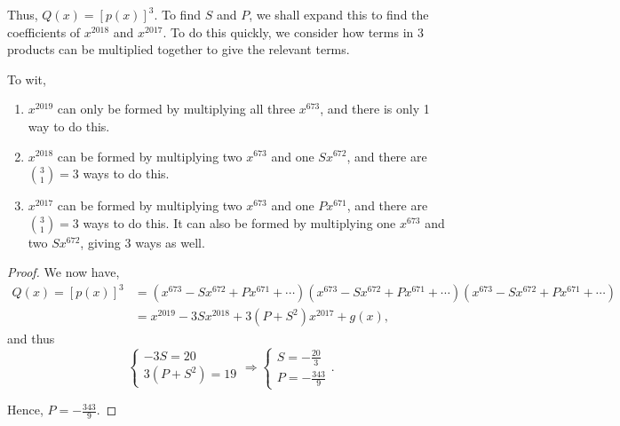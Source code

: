 \documentclass[../jarvis.tex]{subfiles}
\begin{document}
Thus, $Q(x)=[p(x)]^3$. To find $S$ and $P$, we shall expand this to find the coefficients of $x^{2018}$ and $x^{2017}$. To do this quickly, we consider how terms in 3 products can be multiplied together to give the relevant terms.

To wit, 
\begin{enumerate}
    \item $x^{2019}$ can only be formed by multiplying all three $x^{673}$, and there is only 1 way to do this.
    \item $x^{2018}$ can be formed by multiplying two $x^{673}$ and one $Sx^{672}$, and there are $\binom{3}{1}=3$ ways to do this.
    \item $x^{2017}$ can be formed by multiplying two $x^{673}$ and one $Px^{671}$, and there are $\binom{3}{1}=3$ ways to do this. It can also be formed by multiplying one $x^{673}$ and two $Sx^{672}$, giving $3$ ways as well.
\end{enumerate}
\begin{proof}
    We now have,
\begin{align*}
    Q(x)=[p(x)]^3&=(x^{673}-Sx^{672}+Px^{671}+\cdots)(x^{673}-Sx^{672}+Px^{671}+\cdots)(x^{673}-Sx^{672}+Px^{671}+\cdots) \\
    &= x^{2019}-3Sx^{2018}+3(P+S^2)x^{2017}+g(x),
\end{align*}
and thus
$$\begin{cases} -3S=20 \\ 3(P+S^2)=19 \end{cases}\Rightarrow \begin{cases} S=-\frac{20}{3} \\ P=-\frac{343}{9}\end{cases}.$$

Hence, $\boxed{P=-\frac{343}{9}}$.
\end{proof}
\end{document}

